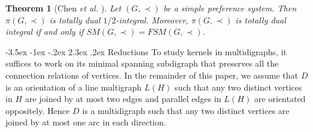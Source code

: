 \documentclass[11pt]{article}
\makeatletter
\newtheorem{theorem}{Theorem}%
\numberwithin{theorem}{section}
\renewcommand\section{%
  \@startsection{section}{1}
                {\z@}%
                {-3.5ex \@plus -1ex \@minus -.2ex}%
                {2.3ex \@plus.2ex}%
                {\large\bfseries}%
}
\makeatother
\begin{document}
\begin{theorem}[Chen \textit{et al.} \cite{ChenDing12}]
\label{thm:ChenDing12}
Let $(G,\prec)$ be a simple preference system. Then $\pi(G,\prec)$ is totally dual $1/2$-integral. Moreover, $\pi(G,\prec)$ is totally dual integral if and only if $SM(G,\prec)=FSM(G,\prec)$.
\end{theorem}

\section{Reductions}
To study kernels in multidigraphs, it suffices to work on its minimal spanning subdigraph that  preserves all the connection relations of vertices. In the remainder of this paper, we assume that $D$ is an orientation of a line multigraph $L(H)$ such that any two distinct vertices in $H$ are joined by at most two edges and parallel edges in $L(H)$ are orientated oppositely. Hence $D$ is a multidigraph such that any two distinct vertices are joined by at most one arc in each direction.
\end{document}
